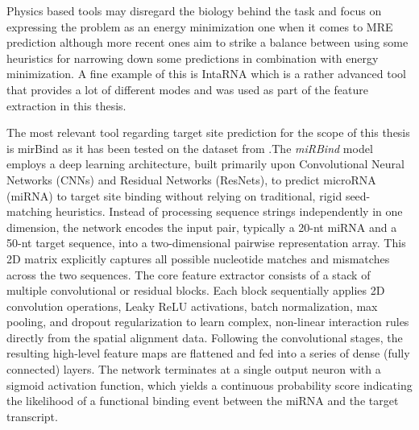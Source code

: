 \documentclass[en,ack]{dimscthesis}
\begin{document}
\par Physics based tools may disregard the biology behind the task and focus on expressing the problem as an energy minimization one when it comes to MRE prediction although more recent ones aim to strike a balance between using some heuristics for narrowing down some predictions in combination with energy minimization. A fine example of this is IntaRNA \parencite{buschIntaRNAEfficientPrediction2008,mannIntaRNA20Enhanced2017,gelhausenIntaRNAhelixcomposingRNARNAInteractions2019,wrightCopraRNAIntaRNAPredicting2014, miladiIntegrationAccessibilityData2019, radenImpactVariousSeed2020} which is a rather advanced tool that provides a lot of different modes and was used as part of the feature extraction in this thesis.  

\par The most relevant tool regarding target site prediction for the scope of this thesis is mirBind \parencite{klimentovaMiRBindDeepLearning2022} as it has been tested on the dataset from \cite{manakovScalableDeepProfiling2022}.The \textit{miRBind} model employs a deep learning architecture, built primarily upon Convolutional Neural Networks (CNNs) and Residual Networks (ResNets), to predict microRNA (miRNA) to target site binding without relying on traditional, rigid seed-matching heuristics. Instead of processing sequence strings independently in one dimension, the network encodes the input pair, typically a 20-nt miRNA and a 50-nt target sequence, into a two-dimensional pairwise representation array. This 2D matrix explicitly captures all possible nucleotide matches and mismatches across the two sequences. The core feature extractor consists of a stack of multiple convolutional or residual blocks. Each block sequentially applies 2D convolution operations, Leaky ReLU activations, batch normalization, max pooling, and dropout regularization to learn complex, non-linear interaction rules directly from the spatial alignment data. Following the convolutional stages, the resulting high-level feature maps are flattened and fed into a series of dense (fully connected) layers. The network terminates at a single output neuron with a sigmoid activation function, which yields a continuous probability score indicating the likelihood of a functional binding event between the miRNA and the target transcript.
\end{document}
